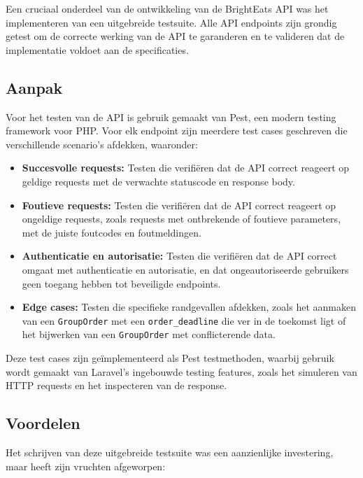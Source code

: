 Een cruciaal onderdeel van de ontwikkeling van de BrightEats API was het implementeren van een uitgebreide testsuite. Alle API endpoints zijn grondig getest om de correcte werking van de API te garanderen en te valideren dat de implementatie voldoet aan de specificaties.

\subsection{Aanpak}

Voor het testen van de API is gebruik gemaakt van Pest, een modern testing framework voor PHP. Voor elk endpoint zijn meerdere test cases geschreven die verschillende scenario's afdekken, waaronder:

\begin{itemize}
  \item \textbf{Succesvolle requests:} Testen die verifiëren dat de API correct reageert op geldige requests met de verwachte statuscode en response body.
  \item \textbf{Foutieve requests:} Testen die verifiëren dat de API correct reageert op ongeldige requests, zoals requests met ontbrekende of foutieve parameters, met de juiste foutcodes en foutmeldingen.
  \item \textbf{Authenticatie en autorisatie:} Testen die verifiëren dat de API correct omgaat met authenticatie en autorisatie, en dat ongeautoriseerde gebruikers geen toegang hebben tot beveiligde endpoints.
  \item \textbf{Edge cases:} Testen die specifieke randgevallen afdekken, zoals het aanmaken van een \texttt{GroupOrder} met een \texttt{order\_deadline} die ver in de toekomst ligt of het bijwerken van een \texttt{GroupOrder} met conflicterende data.
\end{itemize}

Deze test cases zijn geïmplementeerd als Pest testmethoden, waarbij gebruik wordt gemaakt van Laravel's ingebouwde testing features, zoals het simuleren van HTTP requests en het inspecteren van de response.

\subsection{Voordelen}

Het schrijven van deze uitgebreide testsuite was een aanzienlijke investering, maar heeft zijn vruchten afgeworpen:

